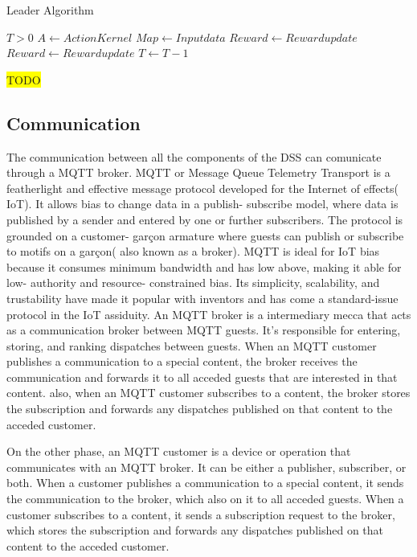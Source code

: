 \documentclass[journal,article,submit,pdftex,moreauthors]{Definitions/mdpi}
\begin{document}
\begin{algorithm}
	\caption{Leader Algorithm}\label{alg:algorithm}
	\begin{algorithmic}
	\Require $T > 0$ 
	\State $A \gets Action Kernel  $ 
	\State $Map \gets Input data$
	\State $Reward \gets Reward update $
		\State $Reward \gets Reward update $
		\State $T \gets T - 1$
	
	\EndWhile
	\end{algorithmic}
	\end{algorithm}

\colorbox{yellow}{TODO}

\subsection{Communication}
The communication between all the components of the DSS can comunicate through a MQTT broker.
MQTT or Message Queue Telemetry Transport is a featherlight and effective message protocol developed for the Internet of effects( IoT). 
It allows bias to change data in a publish- subscribe model, where data is published by a sender and entered by one or further subscribers. The protocol is grounded on a customer- garçon armature where guests can publish or subscribe to motifs on a garçon( also known as a broker). MQTT is ideal for IoT bias because it consumes minimum bandwidth and has low above, making it able for low- authority and resource- constrained bias. 
Its simplicity, scalability, and trustability have made it popular with inventors and has come a standard-issue protocol in the IoT assiduity.
An MQTT broker is a intermediary mecca that acts as a communication broker between MQTT guests. It's responsible for entering, storing, and ranking dispatches between guests. When an MQTT customer publishes a communication to a special content, the broker receives the communication and forwards it to all acceded guests that are interested in that content. also, when an MQTT customer subscribes to a content, the broker stores the subscription and forwards any dispatches published on that content to the acceded customer.

On the other phase, an MQTT customer is a device or operation that communicates with an MQTT broker. It can be either a publisher, subscriber, or both. When a customer publishes a communication to a special content, it sends the communication to the broker, which also on it to all acceded guests. When a customer subscribes to a content, it sends a subscription request to the broker, which stores the subscription and forwards any dispatches published on that content to the acceded customer.
\end{document}
